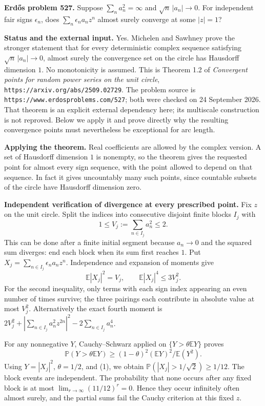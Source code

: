 \textbf{Erd\H{o}s problem 527.}
Suppose $\sum_n a_n^2=\infty$ and $\sqrt n\,|a_n|\to0$. For independent fair signs $\epsilon_n$, does $\sum_n\epsilon_na_nz^n$ almost surely converge at some $|z|=1$?

\textbf{Status and the external input.}
Yes. Michelen and Sawhney prove the stronger statement that for every deterministic complex sequence satisfying $\sqrt n\,|a_n|\to0$, almost surely the convergence set on the circle has Hausdorff dimension $1$. No monotonicity is assumed. This is Theorem 1.2 of \emph{Convergent points for random power series on the unit circle},
\texttt{https://arxiv.org/abs/2509.02729}.
The problem source is \texttt{https://www.erdosproblems.com/527}; both were checked on 24 September 2026.
That theorem is an explicit external dependency here; its multiscale construction is not reproved. Below we apply it and prove directly why the resulting convergence points must nevertheless be exceptional for arc length.

\textbf{Applying the theorem.}
Real coefficients are allowed by the complex version. A set of Hausdorff dimension $1$ is nonempty, so the theorem gives the requested point for almost every sign sequence, with the point allowed to depend on that sequence. In fact it gives uncountably many such points, since countable subsets of the circle have Hausdorff dimension zero.

\textbf{Independent verification of divergence at every prescribed point.}
Fix $z$ on the unit circle. Split the indices into consecutive disjoint finite blocks $I_j$ with
\[
 1\leq V_j:=\sum_{n\in I_j}a_n^2\leq2.
\]
This can be done after a finite initial segment because $a_n\to0$ and the squared sum diverges: end each block when its sum first reaches $1$. Put
$X_j=\sum_{n\in I_j}\epsilon_na_nz^n$.
Independence and expansion of moments give
\[
 \mathbb E|X_j|^2=V_j,\qquad
 \mathbb E|X_j|^4\leq3V_j^2.                            \tag{1}
\]
For the second inequality, only terms with each sign index appearing an even number of times survive; the three pairings each contribute in absolute value at most $V_j^2$. Alternatively the exact fourth moment is
$2V_j^2+|\sum_{n\in I_j}a_n^2z^{2n}|^2-2\sum_{n\in I_j}a_n^4$.

For any nonnegative $Y$, Cauchy--Schwarz applied on $\{Y>\theta\mathbb EY\}$ proves
\[
 \mathbb P(Y>\theta\mathbb EY)
 \geq(1-\theta)^2(\mathbb EY)^2/\mathbb E(Y^2).
\]
Using $Y=|X_j|^2$, $\theta=1/2$, and (1), we obtain
$\mathbb P(|X_j|>1/\sqrt2)\geq1/12$.
The block events are independent. The probability that none occurs after any fixed block is at most $\lim_{r\to\infty}(11/12)^r=0$. Hence they occur infinitely often almost surely, and the partial sums fail the Cauchy criterion at this fixed $z$.

